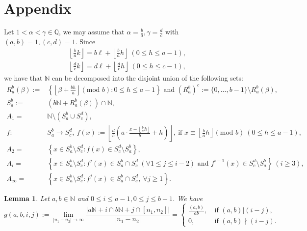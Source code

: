 \documentclass{amsart}
\newtheorem{lemma}[theorem]{Lemma}
\theoremstyle{definition}
\numberwithin{equation}{section}%
\begin{document}
\section{Appendix}\label{appendix}
 Let $1<\alpha<\gamma\in \mathbb{Q}$, we may assume that $\alpha=\frac{b}{a}, \gamma=\frac{d}{c}$ with $(a,b)=1, (c,d)=1$. Since 
\begin{align*}
     \left\lfloor \frac{b}{a}k\right\rfloor=b\ell+ \left\lfloor \frac{b}{a}h\right\rfloor~(0\leq h\leq a-1),\\
      \left\lfloor \frac{d}{c}k\right\rfloor=d\ell+ \left\lfloor \frac{d}{c}h\right\rfloor~(0\leq h\leq c-1),
\end{align*}
we have that $\mathbb{N}$ can be decomposed into the disjoint union of the following sets:
\begin{align*}
R_a^b(\beta):=&\left\{\left\lfloor \beta+\frac{bh}{a}\right\rfloor (\mbox{mod } b) : 0\leq h\leq a-1\right\}\mbox{ and }(R_a^b)^c:=\{0, ..., b-1\}\setminus R_a^b(\beta),\\
S_a^b:=& (b\mathbb{N}+R_a^b(\beta))\cap \mathbb{N},\\
    A_1=&\mathbb{N}\setminus (S_a^b\cup S_c^d),\\
    f:&S_a^b\to S_c^d,~ f(x):=\left\lfloor \frac{d}{c}\left(a\cdot \frac{x-\left\lfloor \frac{b}{a}h\right\rfloor}{b}+h\right)\right\rfloor,~\mbox{if }x\equiv \left\lfloor \frac{b}{a}h\right\rfloor(\mbox{mod } b)~(0\leq h\leq a-1),\\
    A_2=&\left\{x\in S_a^b \setminus S_c^d:f(x)\in S_c^d \setminus S_a^b\right\},\\
    A_i=&\left\{x\in S_a^b \setminus S_c^d:f^{j}(x)\in S_a^b \cap S_c^d ~(\forall 1\leq j\leq i-2)\mbox{ and }f^{i-1}(x)\in S_c^d\setminus S_a^b \right\}~(i\geq 3),\\
    A_{\infty}=&\left\{x\in S_a^b \setminus S_c^d:f^{j}(x)\in S_a^b \cap S_c^d ,~\forall  j\geq 1 \right\}.
\end{align*}

\begin{lemma}\label{lma 1}
    Let $a,b\in\mathbb{N}$ and $0\leq i\leq a-1, 0\leq j\leq b-1$. We have
    \begin{equation*}
          g(a,b,i,j):=\lim_{|n_1-n_2|\to\infty}\frac{|a\mathbb{N}+i\cap b\mathbb{N}+j\cap [n_1,n_2]|}{|n_1-n_2|}=\left\{\begin{array}{cc}
         \frac{(a,b)}{ab},~&\mbox{if }(a,b)|(i-j),  \\
         0,~&\mbox{if }(a,b)\nmid(i-j).
    \end{array}\right.
    \end{equation*}  
\end{lemma}
\end{document}
